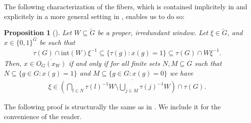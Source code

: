 \documentclass[titlepage,reqno,10pt]{amsart}
\newtheorem{proposition}[theorem]{Proposition}
\theoremstyle{definition}
\def\T{{\mathbb T}}
\newcommand{\tm}{\subseteq}
\newcommand{\kl}{\left(}
\newcommand{\kr}{\right)}
\begin{document}


The following characterization of the fibers, which is contained implicitely in \cite[Section 3.2]{JLO19} and explicitely in a more general setting in \cite{DJL}, enables us to do so:
 \begin{proposition}[\cite{DJL, JLO19}]\label{prop: criterion being in fiber}
    Let $W\subseteq \overleftarrow{G}$ be a proper, irredundant window. 
    Let $\xi\in \overleftarrow{G}$, and $x\in \{0,1\}^G$ be such that 
    \begin{align*}
        \tau(G)\cap \mathrm{int}(W)\xi^{-1}\subseteq \{\tau(g):x(g)=1\}\subseteq \tau(G)\cap W\xi^{-1}.
    \end{align*}
    Then, $x\in \overline{O_G(x_W)}$ if and only if for all finite sets $N,M\subseteq G$ such that $N\subseteq \{g\in G:x(g)=1\}$ and $M\subseteq \{g\in G:x(g)=0\}$ we have
    \begin{align}\label{eq: xi-closed}
        \xi\in \overline{\kl \bigcap_{l\in N} {\tau(l)}^{-1}W \setminus \bigcup_{j\in M}  \tau(j)^{-1}W  \kr \cap  \tau(G)}.
    \end{align}
\end{proposition}
The following proof is structurally the same as in \cite{DJL}. We include it for the convenience of the reader. 
\end{document}
